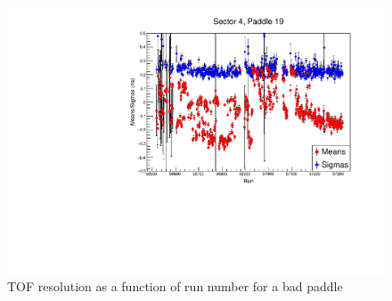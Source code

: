 \begin{v2}
\begin{figure}\begin{center}
      \includegraphics[width=0.95\columnwidth]{figures/calib/tof/badexample.pdf}
   \caption{\label{plot:example.badpaddle}TOF resolution as a function of run number for a bad paddle}
\end{center}\end{figure}
\end{v2}

\FloatBarrier

